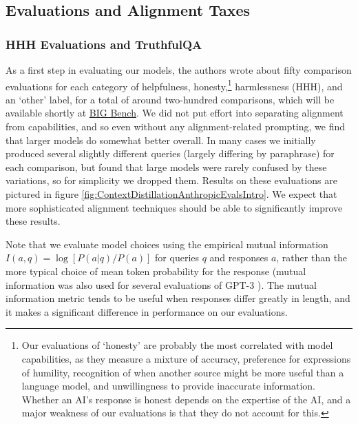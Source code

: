 \subsection{Evaluations and Alignment Taxes}

\subsubsection{HHH Evaluations and TruthfulQA}

As a first step in evaluating our models, the authors wrote about fifty comparison evaluations for each category of helpfulness, honesty,\footnote{Our evaluations of `honesty' are probably the most correlated with model capabilities, as they measure a mixture of accuracy, preference for expressions of humility, recognition of when another source might be  more useful than a language model, and unwillingness to provide inaccurate information.  Whether an AI's response is honest depends on the expertise of the AI, and a major weakness of our evaluations is that they do not account for this.} harmlessness (HHH), and  an `other' label, for a total of around two-hundred comparisons, which will be available shortly at \href{https://github.com/google/BIG-bench}{BIG Bench}.  We did not put effort into separating alignment from capabilities, and so even without any alignment-related prompting, we find that larger models do somewhat better overall. In many cases we initially produced several slightly different queries (largely differing by paraphrase) for each comparison, but found that large models were rarely confused by these variations, so for simplicity we dropped them.  Results on these evaluations are pictured in figure \ref{fig:ContextDistillationAnthropicEvalsIntro}.  We expect that more sophisticated alignment techniques should be able to significantly improve these results.  

 Note that we evaluate model choices using the empirical mutual information $I(a, q) = \log \left[ P(a | q) / P(a) \right]$ for queries $q$ and responses $a$, rather than the more typical choice of mean token probability for the response (mutual information was also used for several evaluations of GPT-3 \cite{brown2020language}).   The mutual information metric tends to be useful when responses differ greatly in length, and it makes a significant difference in performance on our evaluations.  

